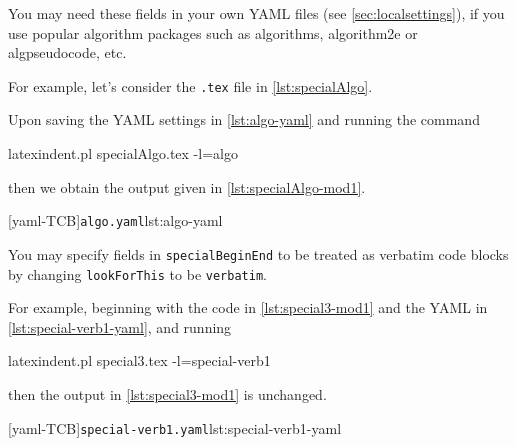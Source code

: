  You may need these fields in your own YAML files (see \vref{sec:localsettings}), if you
 use popular algorithm packages such as algorithms, algorithm2e or algpseudocode, etc.

 \begin{example}
 For example, let’s consider the \texttt{.tex} file in \cref{lst:specialAlgo}.
  


 Upon saving the YAML settings in \cref{lst:algo-yaml} and running the command

 \begin{commandshell}
latexindent.pl specialAlgo.tex -l=algo
 \end{commandshell}

 then we obtain the output given in \cref{lst:specialAlgo-mod1}.

 \begin{cmhtcbraster}
  [yaml-TCB]{\texttt{algo.yaml}}{lst:algo-yaml}
 \end{cmhtcbraster}
 \end{example}

 You may  specify fields in
 \texttt{specialBeginEnd} to be treated as verbatim code blocks by changing
 \texttt{lookForThis} to be \texttt{verbatim}. %

 \begin{example}
 For example, beginning with the code in \cref{lst:special3-mod1} and the YAML in
 \cref{lst:special-verb1-yaml}, and running 

 \begin{commandshell}
latexindent.pl special3.tex -l=special-verb1
\end{commandshell}

 then the output in \cref{lst:special3-mod1} is unchanged.

 \begin{cmhtcbraster}
  [yaml-TCB]{\texttt{special-verb1.yaml}}{lst:special-verb1-yaml}
 \end{cmhtcbraster}
 \end{example}


